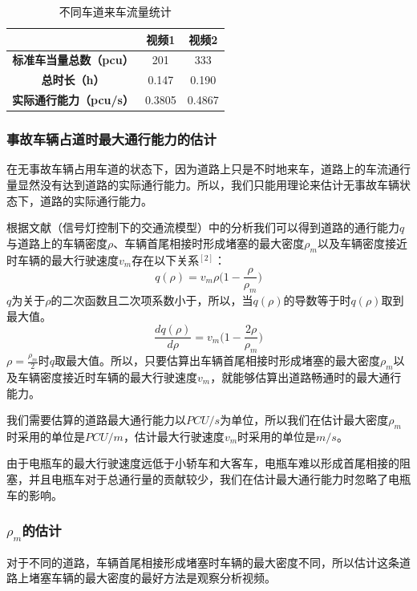 \documentclass{cumcmart}
\begin{document}
\begin{table}[htbp]
\centering
\begin{tabular}{|c|c|c|}
\hline
 &\textbf{视频1}&\textbf{视频2} \\
\hline
\textbf{标准车当量总数（pcu）}&201&333 \\
\hline
\textbf{总时长（h）}&0.147&0.190 \\
\hline
\textbf{实际通行能力（pcu/s）}&0.3805&0.4867 \\
\hline
\end{tabular}
\label{tab5}
\caption{不同车道来车流量统计}
\end{table}

\subsubsection{事故车辆占道时最大通行能力的估计}
在无事故车辆占用车道的状态下，因为道路上只是不时地来车，道路上的车流通行量显然没有达到道路的实际通行能力。所以，我们只能用理论来估计无事故车辆状态下，道路的实际通行能力。

根据文献（信号灯控制下的交通流模型）中的分析我们可以得到道路的通行能力$ {q}$与道路上的车辆密度$ {\rho
}$、车辆首尾相接时形成堵塞的最大密度$ {\rho
}_{ {m}}$以及车辆密度接近时车辆的最大行驶速度$ {v}_{ {m}}$存在以下关系$^{[2]}$：
\[
 {q(\rho )=} {v}_{ {m}} {\rho (1-}\frac{ {\rho
}}{ {\rho }_{ {m}}} {)}
\]
$ {q}$为关于$ {\rho
}$的二次函数且二次项系数小于，所以，当$ {q(\rho
)}$的导数等于时$ {q(\rho )}$取到最大值。
\[
\frac{ {dq(\rho )}}{ {d\rho
}} {=} {v}_{ {m}} {(1-}\frac{ {2\rho
}}{ {\rho }_{ {m}}} {)}
\]
$ {\rho =}\frac{ {\rho
}_{ {m}}}{ {2}}$时$ {q}$取最大值。所以，只要估算出车辆首尾相接时形成堵塞的最大密度$ {\rho
}_{ {m}}$以及车辆密度接近时车辆的最大行驶速度$ {v}_{ {m}}$，就能够估算出道路畅通时的最大通行能力。

我们需要估算的道路最大通行能力以$ {PCU/s}$为单位，所以我们在估计最大密度$ {\rho
}_{ {m}}$时采用的单位是$ {PCU/m}$，估计最大行驶速度$ {v}_{ {m}}$时采用的单位是$ {m/s}$。

由于电瓶车的最大行驶速度远低于小轿车和大客车，电瓶车难以形成首尾相接的阻塞，并且电瓶车对于总通行量的贡献较少，我们在估计最大通行能力时忽略了电瓶车的影响。
\subsubsection{$\rho_{m}$的估计}
对于不同的道路，车辆首尾相接形成堵塞时车辆的最大密度不同，所以估计这条道路上堵塞车辆的最大密度的最好方法是观察分析视频。
\end{document}
